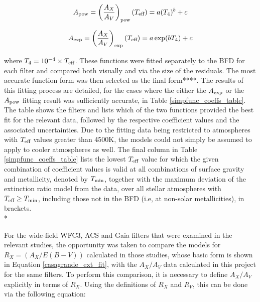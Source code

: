 \documentclass[12pt, a4paper]{report}
\begin{document}
\begin{equation}
A_{\textnormal{pow}} = \left(\frac{A_{X}}{A_{V}}\right)_{\textnormal{pow}}(T_{\textnormal{eff}}) = a (T_{4})^{b} + c
\label{Teff_pow}
\end{equation}

\begin{equation}
A_{\textnormal{exp}} = \left(\frac{A_{X}}{A_{V}}\right)_{\textnormal{exp}} (T_{\textnormal{eff}}) = a \exp(b T_{4}) + c
\label{Teff_exp}
\end{equation}

where $T_{4} = 10^{-4} \times T_{\textnormal{eff}}$. These functions were fitted separately to the BFD for each filter and compared both visually and via the size of the residuals. The most accurate function form was then selected as the final form****. The results of this fitting process are detailed, for the cases where the either the $A_{\textnormal{exp}}$ or the $A_{\textnormal{pow}}$ fitting result was sufficiently accurate, in Table \ref{simpfunc_coeffs_table}. The table shows the filters and lists which of the two functions provided the best fit for the relevant data, followed by the respective coefficient values and the associated uncertainties. Due to the fitting data being restricted to atmospheres with $T_{\textnormal{eff}}$ values greater than 4500K, the models could not simply be assumed to apply to cooler atmospheres as well. The final column in Table \ref{simpfunc_coeffs_table} lists the lowest $T_{\textnormal{eff}}$ value for which the given combination of coefficient values is valid at all combinations of surface gravity and metallicity, denoted by $T_{\textnormal{min}}$, together with the maximum deviation of the extinction ratio model from the data, over all stellar atmospheres with $T_{\textnormal{eff}} \geq T_{\textnormal{min}}$, including those not in the BFD (i.e, at non-solar metallicities), in brackets. \\*

For the wide-field WFC3, ACS \citep{2014MNRAS.444..392C} and Gaia \citep{2018MNRAS.479L.102C} filters that were examined in the relevant studies, the opportunity was taken to compare the models for $R_{X} = (A_{X}/E(B-V))$ calculated in those studies, whose basic form is shown in Equation \ref{casagrande_ext_fit}, with the $A_{X}/A_{V}$ data calculated in this project for the same filters. To perform this comparison, it is necessary to define $A_{X}/A_{V}$ explicitly in terms of $R_{X}$. Using the definitions of $R_{X}$ and $R_{V}$, this can be done via the following equation:
\end{document}
